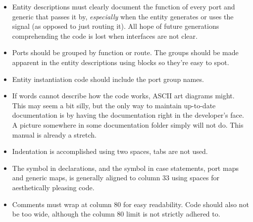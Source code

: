 \begin{itemize}
\item Entity descriptions must clearly document the function of every port and
generic that passes it by, \emph{especially} when the entity generates or uses
the signal (as opposed to just routing it). All hope of future generations
comprehending the code is lost when interfaces are not clear.

\item Ports should be grouped by function or route. The groups should be made
apparent in the entity descriptions using blocks so they're easy to spot.

\item Entity instantiation code should include the port group names.

\item If words cannot describe how the code works, ASCII art diagrams might. 
This may seem a bit silly, but the only way to maintain up-to-date documentation 
is by having the documentation right in the developer's face. A picture 
somewhere in some documentation folder simply will not do. This manual is 
already a stretch.
\item Indentation is accomplished using two spaces, tabs are not used.

\item The \code{:} symbol in declarations, and the \code{=>} symbol in case
statements, port maps and generic maps, is generally aligned to column 33 using
spaces for aesthetically pleasing code.

\item Comments must wrap at column 80 for easy readability. Code should also not 
be too wide, although the column 80 limit is not strictly adhered to.

\end{itemize}

